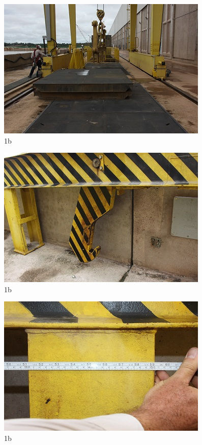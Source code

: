 \begin{figure}[h!]
  \centering
  \includegraphics[width=1\linewidth]{Fotos/Janeiro2015/6.jpg}
  \caption{1b}
  \label{nov20135}
\end{figure}

\begin{figure}[h!]
  \centering
  \includegraphics[width=1\linewidth]{Fotos/Janeiro2015/7.jpg}
  \caption{1b}
  \label{nov20136}
\end{figure}

\begin{figure}[h!]
  \centering
  \includegraphics[width=1\linewidth]{Fotos/Janeiro2015/8.jpg}
  \caption{1b}
  \label{nov20136}
\end{figure}

